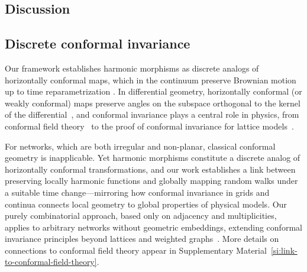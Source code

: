 \documentclass[twocolumn,superscriptaddress,tightenlines,aps,prx,floatfix]{revtex4-2}
\begin{document}
\begin{bibunit}
\section{Discussion}
\label{section:discussion}

\subsection{Discrete conformal invariance}

Our framework establishes harmonic morphisms as discrete analogs of horizontally conformal maps, which in the continuum preserve Brownian motion up to time reparametrization \cite{Lawler2005conformal}. In differential geometry, horizontally conformal (or weakly conformal) maps preserve angles on the subspace orthogonal to the kernel of the differential~\cite{Petersen_diff}, and conformal invariance plays a central role in physics, from conformal field theory~\cite{Introduction_to_Conformal_Field_Theory} to the proof of conformal invariance for lattice models~\cite{Conformal_Invariance_Lattice_Models_Smirnov,Discrete_Complex_Analysis}.

For networks, which are both irregular and non-planar, classical conformal geometry is inapplicable. Yet harmonic morphisms constitute a discrete analog of horizontally conformal transformations, and our work establishes a link between preserving locally harmonic functions and globally mapping random walks under a suitable time change---mirroring how conformal invariance in grids and continua connects local geometry to global properties of physical models.
Our purely combinatorial approach, based only on adjacency and multiplicities, applies to arbitrary networks without geometric embeddings, extending conformal invariance principles beyond lattices and weighted graphs~\cite{Bobenko_Conformal_2015,conformallycovariantoperators}. 
More details on connections to conformal field theory appear in Supplementary Material~\ref{si:link-to-conformal-field-theory}.


\end{bibunit}
\end{document}
